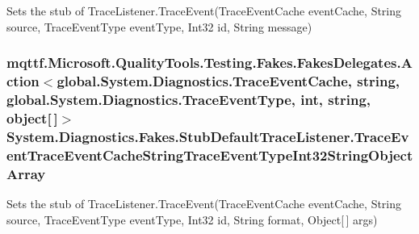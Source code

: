 Sets the stub of Trace\-Listener.\-Trace\-Event(\-Trace\-Event\-Cache event\-Cache, String source, Trace\-Event\-Type event\-Type, Int32 id, String message)

\hypertarget{class_system_1_1_diagnostics_1_1_fakes_1_1_stub_default_trace_listener_a4cbbd9c34958e1037ae83d1e73ac45e7}{
\subsubsection[{Trace\-Event\-Trace\-Event\-Cache\-String\-Trace\-Event\-Type\-Int32\-String\-Object\-Array}]{\setlength{\rightskip}{0pt plus 5cm}mqttf.\-Microsoft.\-Quality\-Tools.\-Testing.\-Fakes.\-Fakes\-Delegates.\-Action$<$global.\-System.\-Diagnostics.\-Trace\-Event\-Cache, string, global.\-System.\-Diagnostics.\-Trace\-Event\-Type, int, string, object\mbox{[}$\,$\mbox{]}$>$ System.\-Diagnostics.\-Fakes.\-Stub\-Default\-Trace\-Listener.\-Trace\-Event\-Trace\-Event\-Cache\-String\-Trace\-Event\-Type\-Int32\-String\-Object\-Array}}\label{class_system_1_1_diagnostics_1_1_fakes_1_1_stub_default_trace_listener_a4cbbd9c34958e1037ae83d1e73ac45e7}


Sets the stub of Trace\-Listener.\-Trace\-Event(\-Trace\-Event\-Cache event\-Cache, String source, Trace\-Event\-Type event\-Type, Int32 id, String format, Object\mbox{[}$\,$\mbox{]} args)

